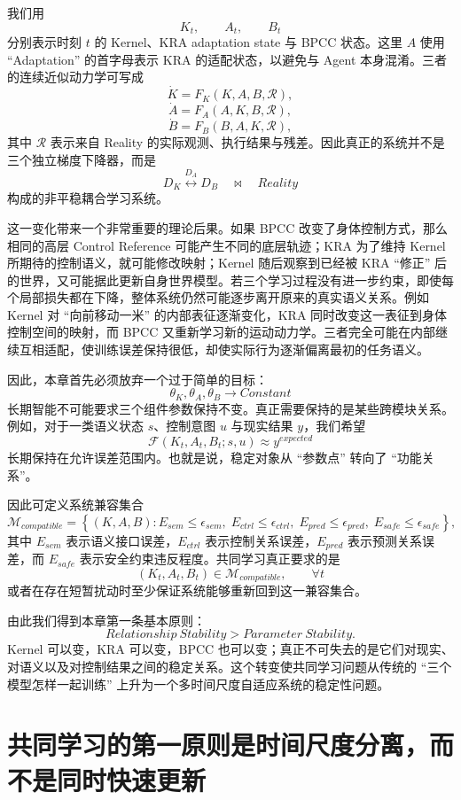 我们用
\[
K_t,\qquad A_t,\qquad B_t
\]
分别表示时刻 $t$ 的 Kernel、KRA adaptation state 与 BPCC 状态。这里 $A$ 使用 ``Adaptation'' 的首字母表示 KRA 的适配状态，以避免与 Agent 本身混淆。三者的连续近似动力学可写成
\[
\dot K
=
F_K
\left(
K,A,B,\mathcal{R}
\right),
\]
\[
\dot A
=
F_A
\left(
A,K,B,\mathcal{R}
\right),
\]
\[
\dot B
=
F_B
\left(
B,A,K,\mathcal{R}
\right),
\]
其中 $\mathcal{R}$ 表示来自 Reality 的实际观测、执行结果与残差。因此真正的系统并不是三个独立梯度下降器，而是
\[
\boxed{
D_K
\overset{D_A}{\longleftrightarrow}
D_B
\quad\bowtie\quad
Reality
}
\]
构成的非平稳耦合学习系统。

这一变化带来一个非常重要的理论后果。如果 BPCC 改变了身体控制方式，那么相同的高层 Control Reference 可能产生不同的底层轨迹；KRA 为了维持 Kernel 所期待的控制语义，就可能修改映射；Kernel 随后观察到已经被 KRA ``修正'' 后的世界，又可能据此更新自身世界模型。若三个学习过程没有进一步约束，即使每个局部损失都在下降，整体系统仍然可能逐步离开原来的真实语义关系。例如 Kernel 对 ``向前移动一米'' 的内部表征逐渐变化，KRA 同时改变这一表征到身体控制空间的映射，而 BPCC 又重新学习新的运动动力学。三者完全可能在内部继续互相适配，使训练误差保持很低，却使实际行为逐渐偏离最初的任务语义。

因此，本章首先必须放弃一个过于简单的目标：
\[
\boxed{
\theta_K,\theta_A,\theta_B\rightarrow Constant
}
\]
长期智能不可能要求三个组件参数保持不变。真正需要保持的是某些跨模块关系。例如，对于一类语义状态 $s$、控制意图 $u$ 与现实结果 $y$，我们希望
\[
\mathcal{F}
\left(
K_t,A_t,B_t;s,u
\right)
\approx
y^{expected}
\]
长期保持在允许误差范围内。也就是说，稳定对象从 ``参数点'' 转向了 ``功能关系''。

因此可定义系统兼容集合
\[
\boxed{
\mathcal{M}_{compatible}
=
\left\{
(K,A,B):
E_{sem}\leq\epsilon_{sem},
\;
E_{ctrl}\leq\epsilon_{ctrl},
\;
E_{pred}\leq\epsilon_{pred},
\;
E_{safe}\leq\epsilon_{safe}
\right\},
}
\]
其中 $E_{sem}$ 表示语义接口误差，$E_{ctrl}$ 表示控制关系误差，$E_{pred}$ 表示预测关系误差，而 $E_{safe}$ 表示安全约束违反程度。共同学习真正要求的是
\[
\boxed{
(K_t,A_t,B_t)\in\mathcal{M}_{compatible},
\qquad
\forall t
}
\]
或者在存在短暂扰动时至少保证系统能够重新回到这一兼容集合。

由此我们得到本章第一条基本原则：
\[
\boxed{
Relationship\ Stability
>
Parameter\ Stability.
}
\]
Kernel 可以变，KRA 可以变，BPCC 也可以变；真正不可失去的是它们对现实、对语义以及对控制结果之间的稳定关系。这个转变使共同学习问题从传统的 ``三个模型怎样一起训练'' 上升为一个多时间尺度自适应系统的稳定性问题。

\section{共同学习的第一原则是时间尺度分离，而不是同时快速更新}

